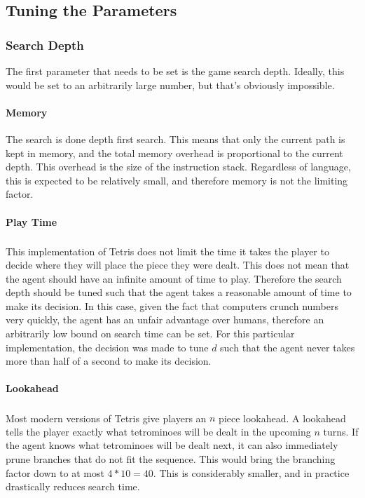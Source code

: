 \documentclass[fontsize=12pt]{article}
\def\tetris{Tetris\textsuperscript{\textregistered}}
\begin{document}
\subsection{Tuning the Parameters}
\label{sub:tuning_the_parameters}

\subsubsection{Search Depth}
\label{ssub:search_depth}
\par The first parameter that needs to be set is the game search depth. Ideally, this would be set to an arbitrarily large number, but that's obviously impossible.
\paragraph{Memory}
\label{par:memory}
The search is done depth first search. This means that only the current path is kept in memory, and the total memory overhead is proportional to the current depth. This overhead is the size of the instruction stack. Regardless of language, this is expected to be relatively small, and therefore memory is not the limiting factor.

\paragraph{Play Time}
\label{par:play_time}
This implementation of \tetris{} does not limit the time it takes the player to decide where they will place the piece they were dealt. This does not mean that the agent should have an infinite amount of time to play. Therefore the search depth should be tuned such that the agent takes a reasonable amount of time to make its decision. In this case, given the fact that computers crunch numbers very quickly, the agent has an unfair advantage over humans, therefore an arbitrarily low bound on search time can be set. For this particular implementation, the decision was made to tune $d$ such that the agent never takes more than half of a second to make its decision.

\paragraph{Lookahead}
\label{par:lookahead}
Most modern versions of \tetris{} give players an $n$ piece lookahead. A lookahead tells the player exactly what tetrominoes will be dealt in the upcoming $n$ turns. If the agent knows what tetrominoes will be dealt next, it can also immediately prune branches that do not fit the sequence. This would bring the branching factor down to at most $4 * 10 = 40$. This is considerably smaller, and in practice drastically reduces search time.
\end{document}
